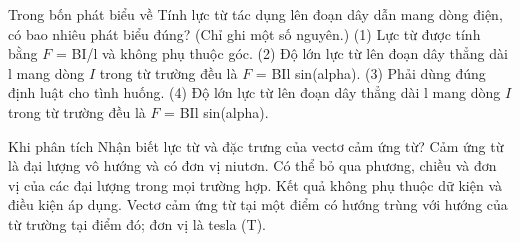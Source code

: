 \begin{ex}
Trong bốn phát biểu về Tính lực từ tác dụng lên đoạn dây dẫn mang dòng điện, có bao nhiêu phát biểu đúng? (Chỉ ghi một số nguyên.) (1) Lực từ được tính bằng $F$ = BI/l và không phụ thuộc góc. (2) Độ lớn lực từ lên đoạn dây thẳng dài l mang dòng $I$ trong từ trường đều là $F$ = BIl sin(alpha). (3) Phải dùng đúng định luật cho tình huống. (4) Độ lớn lực từ lên đoạn dây thẳng dài l mang dòng $I$ trong từ trường đều là $F$ = BIl sin(alpha).
\end{ex}

\begin{ex}
Khi phân tích Nhận biết lực từ và đặc trưng của vectơ cảm ứng từ?
\choice
{Cảm ứng từ là đại lượng vô hướng và có đơn vị niutơn.}
{Có thể bỏ qua phương, chiều và đơn vị của các đại lượng trong mọi trường hợp.}
{Kết quả không phụ thuộc dữ kiện và điều kiện áp dụng.}
{\True Vectơ cảm ứng từ tại một điểm có hướng trùng với hướng của từ trường tại điểm đó; đơn vị là tesla (T).}
\end{ex}

